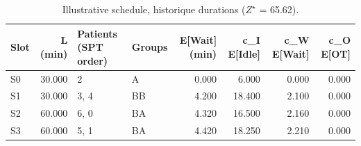 \begin{table}[htbp]
\caption{Illustrative schedule, historique durations ($Z^\star$ = 65.62).}
\label{tab:planning-historique}
\begin{tabular}{lrllrrrr}
\toprule
Slot & L (min) & Patients (SPT order) & Groups & E[Wait] (min) & c\_I E[Idle] & c\_W E[Wait] & c\_O E[OT] \\
\midrule
S0 & 30.000 & 2 & A & 0.000 & 6.000 & 0.000 & 0.000 \\
S1 & 30.000 & 3, 4 & BB & 4.200 & 18.400 & 2.100 & 0.000 \\
S2 & 60.000 & 6, 0 & BA & 4.320 & 16.500 & 2.160 & 0.000 \\
S3 & 60.000 & 5, 1 & BA & 4.420 & 18.250 & 2.210 & 0.000 \\
\bottomrule
\end{tabular}
\end{table}

